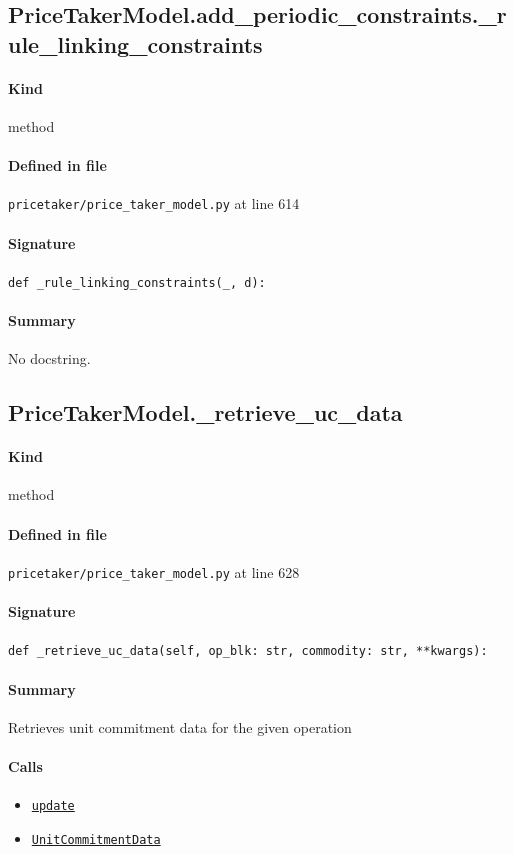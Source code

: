 \documentclass[11pt]{report}
\begin{document}
\subsection{PriceTakerModel.add\_periodic\_constraints.\_rule\_linking\_constraints}
\label{def:pricetaker-price_taker_model.py:PriceTakerModel.add_periodic_constraints._rule_linking_constraints:L614}
\paragraph{Kind} method
\paragraph{Defined in file} \texttt{pricetaker/price\_taker\_model.py} at line 614
\paragraph{Signature} \texttt{def \_rule\_linking\_constraints(\_, d):}
\paragraph{Summary} No docstring.
\subsection{PriceTakerModel.\_retrieve\_uc\_data}
\label{def:pricetaker-price_taker_model.py:PriceTakerModel._retrieve_uc_data:L628}
\paragraph{Kind} method
\paragraph{Defined in file} \texttt{pricetaker/price\_taker\_model.py} at line 628
\paragraph{Signature} \texttt{def \_retrieve\_uc\_data(self, op\_blk: str, commodity: str, **kwargs):}
\paragraph{Summary} Retrieves unit commitment data for the given operation
\paragraph{Calls}
\begin{itemize}[leftmargin=*]
  \item \hyperref[def:pricetaker-unit_commitment.py:UnitCommitmentData.update:L84]{\texttt{update}}
  \item \hyperref[def:pricetaker-unit_commitment.py:UnitCommitmentData:L26]{\texttt{UnitCommitmentData}}
\end{itemize}
\end{document}
